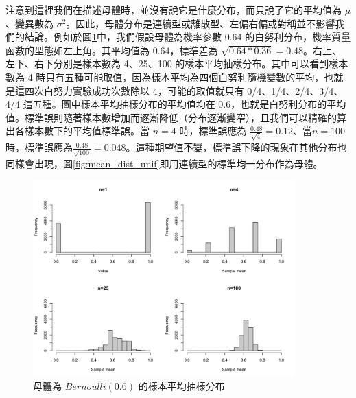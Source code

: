     注意到這裡我們在描述母體時，並沒有說它是什麼分布，而只說了它的平均值為 $\mu$、變異數為 $\sigma^2$。因此，母體分布是連續型或離散型、左偏右偏或對稱並不影響我們的結論。例如於圖\ref{fig:mean_dist_bern}中，我們假設母體為機率參數 0.64 的白努利分布，機率質量函數的型態如左上角。其平均值為 $0.64$，標準差為 $\sqrt{0.64*0.36} = 0.48$。右上、左下、右下分別是樣本數為 4、25、100 的樣本平均抽樣分布。其中可以看到樣本數為 4 時只有五種可能取值，因為樣本平均為四個白努利隨機變數的平均，也就是這四次白努力實驗成功次數除以 4，可能的取值就只有 0/4、1/4、2/4、3/4、4/4 這五種。圖中樣本平均抽樣分布的平均值均在 $0.6$，也就是白努利分布的平均值。標準誤則隨著樣本數增加而逐漸降低（分布逐漸變窄），且我們可以精確的算出各樣本數下的平均值標準誤。當 $n=4$ 時，標準誤應為 $\frac{0.48}{\sqrt{4}} = 0.12$、當$n=100$時，標準誤應為$\frac{0.48}{\sqrt{100}} = 0.048$。這種期望值不變，標準誤下降的現象在其他分布也同樣會出現，圖\ref{fig:mean_dist_unif}即用連續型的標準均一分布作為母體。

    \begin{figure}[htbp]
        \centering
        \includegraphics[width=0.9\textwidth]{figures/04-Sampling_distribution_CLT/mean_dist_bern.png}
        \caption{母體為 $Bernoulli(0.6)$ 的樣本平均抽樣分布}
        \label{fig:mean_dist_bern}
    \end{figure}

